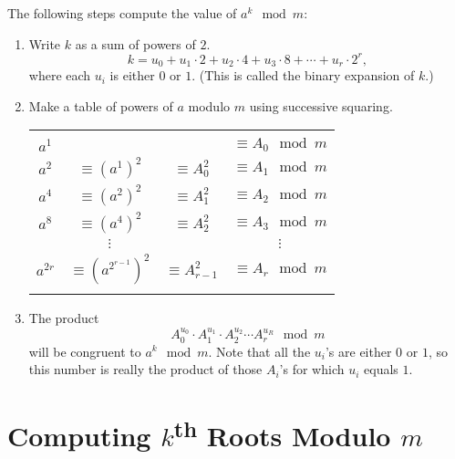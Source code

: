 \documentclass[10pt]{article}
\begin{document}
\begin{algorithm}[\textcolor{red}{Successive Squaring to Compute $a^k$ modulo $m$}]
    The following steps compute the value of $a^k \mod{m}$:
    \begin{enumerate}
        \item Write $k$ as a sum of powers of $2$.
            \[k=u_0+u_1\cdot 2 +u_2 \cdot 4 + u_3 \cdot 8 + \cdots + u_r \cdot 2^r,\]
            where each $u_i$ is either $0$ or $1$. (This is called the binary expansion of $k$.)
        \item Make a table of powers of $a$ modulo $m$ using successive squaring.
            \begin{center} 
            {\renewcommand{\arraystretch}{1.0}
                \begin{tabular}{ c c c c }
            \hline
                    \\
                $a^1$ &             &                   & $\equiv A_0 \mod{m}$ \\
                $a^2$ & $\equiv(a^1)^2$   & $\equiv A_0^2$    & $\equiv A_1 \mod{m}$ \\
                $a^4$ & $\equiv(a^2)^2$   & $\equiv A_1^2$    & $\equiv A_2 \mod{m}$ \\
                $a^8$ & $\equiv(a^4)^2$   & $\equiv A_2^2$    & $\equiv A_3 \mod{m}$ \\
                        & $\vdots$        &                   & $\vdots$ \\
                $a^{2r}$ & $\equiv \left(a^{2^{r-1}} \right)^2$   & $\equiv A_{r-1}^2$    & $\equiv A_r \mod{m}$ \\
\\
                \hline
                \end{tabular}}
            \end{center}
        \item The product
            \[A_0^{u_0}\cdot A_1^{u_1} \cdot A_2^{u_2} \cdots A_r^{u_R} \mod{m}\]
            will be congruent to $a^k \mod{m}$. Note that all the $u_i$'s are either $0$ or $1$, so this number is really the product of those $A_i$'s for which $u_i$ equals $1$.
    \end{enumerate}
\end{algorithm}

\section{Computing $k$\textsuperscript{th} Roots Modulo $m$}
\end{document}
